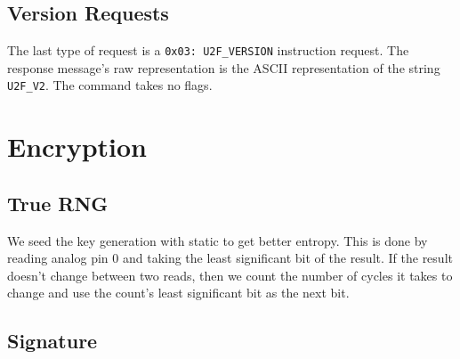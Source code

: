 \documentclass[acmtog,review]{acmart}
\begin{document}


\subsection{Version Requests}

The last type of request is a \texttt{0x03: U2F\_VERSION} instruction request. The response message's raw representation is the ASCII representation of the string \texttt{U2F\_V2}. The command takes no flags.


\section{Encryption}


\subsection{True RNG}

We seed the key generation with static to get better entropy. This is done by reading analog pin $0$ and taking the least 
significant bit of the result. If the result doesn't change between two reads, then we count the number of cycles
it takes to change and use the count's least significant bit as the next bit. 

\subsection{Signature}
\end{document}
